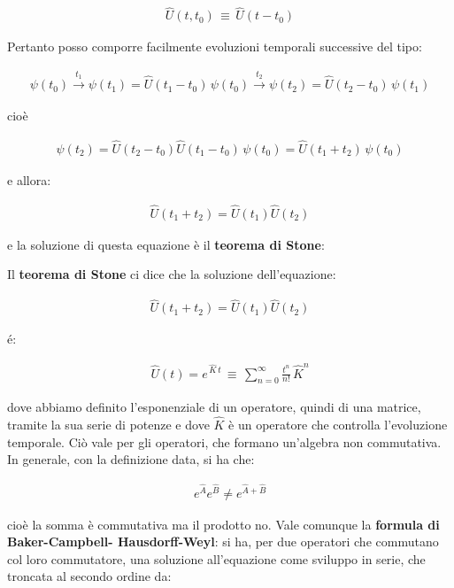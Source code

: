\begin{align*}
	\hat{U}(t, t_0) \, \equiv \, \hat{U}(t-t_0)
\end{align*}

	Pertanto posso comporre facilmente evoluzioni temporali successive del tipo:
	
\begin{align*}
	\psi(t_0) \xrightarrow{t_1} \psi(t_1 ) = \hat{U}(t_1 - t_0) \, \psi(t_0) \xrightarrow{t_2} \psi(t_2) =  \hat{U}(t_2 - t_0) \, \psi(t_1)
\end{align*}
	
	cioè

\begin{align*}
	\psi(t_2) = \hat{U}(t_2 - t_0) \hat{U}(t_1 - t_0) \, \psi(t_0) = \hat{U}(t_1 + t_2) \, \psi(t_0)
\end{align*}

	e allora:
	
\begin{align*}
	\hat{U}(t_1 + t_2) = \hat{U}(t_1)\hat{U}(t_2)
\end{align*}
	
	e la soluzione di questa equazione è il \textbf{teorema di Stone}:
	
\begin{myth}
	Il \textbf{teorema di Stone} ci dice che la soluzione dell'equazione:
	
\begin{align*}
	\hat{U}(t_1 + t_2) = \hat{U}(t_1)\hat{U}(t_2)
\end{align*}

	é:
	
\begin{align*}
	\hat{U}(t) = e^{ \, \hat{K} \, t} \, \equiv \, \sum_{n = 0}^{\infty} \frac{t^n}{n!} \, \hat{K}^n
\end{align*}
\end{myth}
	
	dove abbiamo definito l’esponenziale di un operatore, quindi di una matrice, tramite la sua serie di potenze e dove $\hat{K}$ è un operatore che controlla l’evoluzione temporale. Ciò vale per gli operatori, che formano un'algebra non commutativa. In generale, con la definizione data, si ha che:
	
\begin{align*}
	e^{\hat{A}}e^{\hat{B}} \neq e^{\hat{A} + \hat{B}}
\end{align*}

	cioè la somma è commutativa ma il prodotto no. Vale comunque la \textbf{formula di Baker-Campbell- Hausdorff-Weyl}: si ha, per due operatori che commutano col loro commutatore, una soluzione all'equazione come sviluppo in serie, che troncata al secondo ordine da:
	
